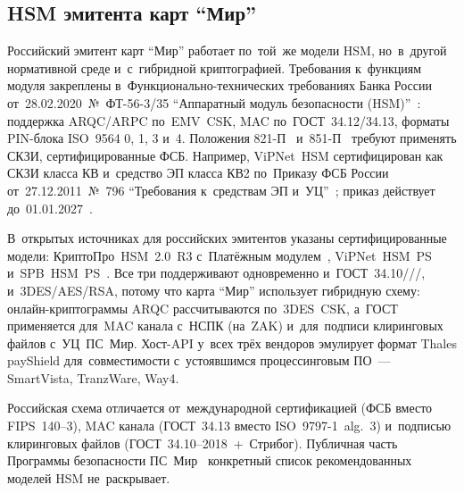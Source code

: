 \FloatBarrier
\subsection*{HSM эмитента карт \enquote{Мир}}\label{sec:crypto-hsm-mir}

Российский эмитент карт \enquote{Мир} работает по~той~же модели HSM, но~в~другой
нормативной среде и~с~гибридной криптографией. Требования к~функциям модуля
закреплены в~Функционально-технических требованиях Банка России
от~28.02.2020~№~ФТ-56-3/35 \enquote{Аппаратный модуль безопасности
(HSM)}~\cite{cbr-ft-56-hsm}: поддержка ARQC/ARPC по~EMV~CSK, MAC
по~ГОСТ~34.12/34.13, форматы PIN-блока ISO~9564 0, 1, 3 и~4. Положения
821-П~\cite{cbr-821p} и~851-П~\cite{cbr-851p} требуют применять СКЗИ,
сертифицированные ФСБ. Например, ViPNet~HSM сертифицирован как СКЗИ класса КВ
и~средство ЭП класса КВ2 по~Приказу ФСБ России от~27.12.2011~№~796
\enquote{Требования к~средствам ЭП и~УЦ}~\cite{infotecs-vipnet-hsm-fsb-2023};
приказ действует до~01.01.2027~\cite{fsb-796}.

В~открытых источниках для российских эмитентов указаны сертифицированные модели:
КриптоПро~HSM~2.0~R3 с~Платёжным модулем~\cite{cryptopro-hsm-payment},
ViPNet~HSM~PS~\cite{vipnet-hsm-ps} и~SPB~HSM~PS~\cite{spb-hsm-ps}. Все три
поддерживают одновременно и~ГОСТ~34.10///, и~3DES/AES/RSA,
потому что карта \enquote{Мир} использует гибридную схему: онлайн-криптограммы ARQC
рассчитываются по~3DES~CSK, а~ГОСТ применяется для~MAC канала с~НСПК (на~ZAK)
и~для~подписи клиринговых файлов с~УЦ~ПС~Мир. Хост-API у~всех трёх вендоров
эмулирует формат Thales payShield для~совместимости с~устоявшимся
процессинговым ПО~--- SmartVista, TranzWare, Way4.

Российская схема отличается от~международной сертификацией (ФСБ вместо
FIPS~140--3), MAC канала (ГОСТ~34.13 вместо ISO~9797-1~alg.~3) и~подписью
клиринговых файлов (ГОСТ~34.10--2018~+~Стрибог). Публичная часть Программы
безопасности ПС~Мир~\cite{nspk-mir-security} конкретный список рекомендованных
моделей HSM не~раскрывает.

